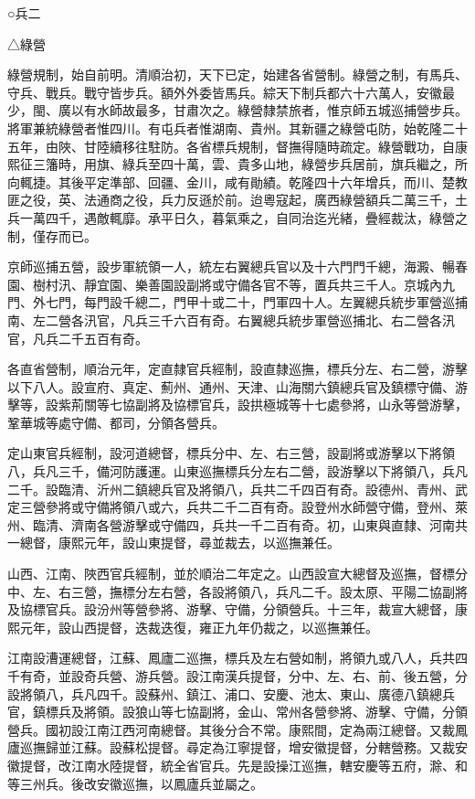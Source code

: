 
\begin{pinyinscope}
○兵二

△綠營

綠營規制，始自前明。清順治初，天下已定，始建各省營制。綠營之制，有馬兵、守兵、戰兵。戰守皆步兵。額外外委皆馬兵。綜天下制兵都六十六萬人，安徽最少，閩、廣以有水師故最多，甘肅次之。綠營隸禁旅者，惟京師五城巡捕營步兵。將軍兼統綠營者惟四川。有屯兵者惟湖南、貴州。其新疆之綠營屯防，始乾隆二十五年，由陜、甘陸續移往駐防。各省標兵規制，督撫得隨時疏定。綠營戰功，自康熙征三籓時，用旗、綠兵至四十萬，雲、貴多山地，綠營步兵居前，旗兵繼之，所向輒捷。其後平定準部、回疆、金川，咸有勛績。乾隆四十六年增兵，而川、楚教匪之役，英、法通商之役，兵力反遜於前。迨粵寇起，廣西綠營額兵二萬三千，土兵一萬四千，遇敵輒靡。承平日久，暮氣乘之，自同治迄光緒，疊經裁汰，綠營之制，僅存而已。

京師巡捕五營，設步軍統領一人，統左右翼總兵官以及十六門門千總，海澱、暢春園、樹村汛、靜宜園、樂善園設副將或守備各官不等，置兵共三千人。京城內九門、外七門，每門設千總二，門甲十或二十，門軍四十人。左翼總兵統步軍營巡捕南、左二營各汛官，凡兵三千六百有奇。右翼總兵統步軍營巡捕北、右二營各汛官，凡兵二千五百有奇。

各直省營制，順治元年，定直隸官兵經制，設直隸巡撫，標兵分左、右二營，游擊以下八人。設宣府、真定、薊州、通州、天津、山海關六鎮總兵官及鎮標守備、游擊等，設紫荊關等七協副將及協標官兵，設拱極城等十七處參將，山永等營游擊，鞏華城等處守備、都司，分領各營兵。

定山東官兵經制，設河道總督，標兵分中、左、右三營，設副將或游擊以下將領八，兵凡三千，備河防護運。山東巡撫標兵分左右二營，設游擊以下將領八，兵凡二千。設臨清、沂州二鎮總兵官及將領八，兵共二千四百有奇。設德州、青州、武定三營參將或守備將領八或六，兵共二千二百有奇。設登州水師營守備，登州、萊州、臨清、濟南各營游擊或守備四，兵共一千二百有奇。初，山東與直隸、河南共一總督，康熙元年，設山東提督，尋並裁去，以巡撫兼任。

山西、江南、陜西官兵經制，並於順治二年定之。山西設宣大總督及巡撫，督標分中、左、右三營，撫標分左右營，各設將領八，兵凡二千。設太原、平陽二協副將及協標官兵。設汾州等營參將、游擊、守備，分領營兵。十三年，裁宣大總督，康熙元年，設山西提督，迭裁迭復，雍正九年仍裁之，以巡撫兼任。

江南設漕運總督，江蘇、鳳廬二巡撫，標兵及左右營如制，將領九或八人，兵共四千有奇，並設奇兵營、游兵營。設江南漢兵提督，分中、左、右、前、後五營，分設將領八，兵凡四千。設蘇州、鎮江、浦口、安慶、池太、東山、廣德八鎮總兵官，鎮標兵及將領。設狼山等七協副將，金山、常州各營參將、游擊、守備，分領營兵。國初設江南江西河南總督。其後分合不常。康熙間，定為兩江總督。又裁鳳廬巡撫歸並江蘇。設蘇松提督。尋定為江寧提督，增安徽提督，分轄營務。又裁安徽提督，改江南水陸提督，統全省官兵。先是設操江巡撫，轄安慶等五府，滁、和等三州兵。後改安徽巡撫，以鳳廬兵並屬之。


\end{pinyinscope}
